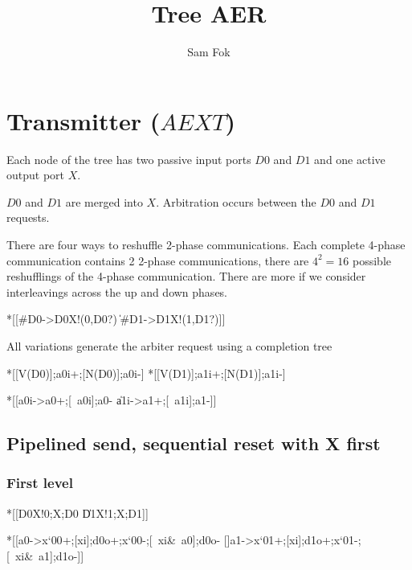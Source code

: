 \documentclass{article}
\begin{document}
\title{Tree AER}
\author{Sam Fok}
\maketitle

\section{Transmitter ($AEXT$)}

Each node of the tree has two passive input ports $D0$ and $D1$ and one active output port $X$.

$D0$ and $D1$ are merged into $X$. Arbitration occurs between the $D0$ and $D1$ requests. 

There are four ways to reshuffle 2-phase communications. Each complete 4-phase communication contains 2 2-phase communications, there are $4^2=16$ possible reshufflings of the 4-phase communication. There are more if we consider interleavings across the up and down phases. 

\begin{csp}
*[[#{D0}->D0\*X!(0,D0?)
  \|#{D1}->D1\*X!(1,D1?)]]
\end{csp}

All variations generate the arbiter request using a completion tree

\begin{hse}
*[[V(D0)];a0i+;[N(D0)];a0i-]
*[[V(D1)];a1i+;[N(D1)];a1i-]
\end{hse}

\begin{hse}
*[[a0i->a0+;[~a0i];a0-
  \|a1i->a1+;[~a1i];a1-]]
\end{hse}

\subsection{Pipelined send, sequential reset with X first}

\subsubsection{First level}

\begin{csp}
*[[D0\star\!X!0;X;D0
  \|D1\star\!X!1;X;D1]]
\end{csp}

\begin{hse}
*[[a0->x`{00}+;[xi];d0o+;x`{00}-;[~xi&~a0];d0o-
  []a1->x`{01}+;[xi];d1o+;x`{01}-;[~xi&~a1];d1o-]]
\end{hse}
\end{document}
